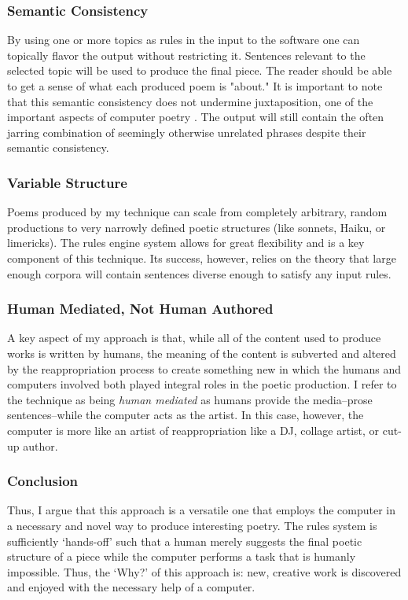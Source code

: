 \documentclass[10pt]{article}
\begin{document}
\subsubsection{Semantic Consistency}
By using one or more topics as rules in the input to the software one can
topically flavor the output without restricting it. Sentences relevant to the
selected topic will be used to produce the final piece. The reader should be
able to get a sense of what each produced poem is "about." It is important to
note that this semantic consistency does not undermine juxtaposition, one of
the important aspects of computer poetry \cite{Hart96}. The output will still
contain the often jarring combination of seemingly otherwise unrelated phrases
despite their semantic consistency.

\subsubsection{Variable Structure}
Poems produced by my technique can scale from completely arbitrary, random
productions to very narrowly defined poetic structures (like sonnets, Haiku, or
limericks). The rules engine system allows for great flexibility and is a key
component of this technique. Its success, however, relies on the theory that
large enough corpora will contain sentences diverse enough to satisfy any input
rules.

\subsubsection{Human Mediated, Not Human Authored}
A key aspect of my approach is that, while all of the content used to produce
works is written by humans, the meaning of the content is subverted and altered
by the reappropriation process to create something new in which the humans and
computers involved both played integral roles in the poetic production. I refer
to the technique as being \emph{human mediated} as humans provide the
media--prose sentences--while the computer acts as the artist. In this case,
however, the computer is more like an artist of reappropriation like a DJ,
collage artist, or cut-up author.

\subsubsection{Conclusion}
Thus, I argue that this approach is a versatile one that employs the computer in a
necessary and novel way to produce interesting poetry. The rules system is
sufficiently `hands-off' such that a human merely suggests the final poetic
structure of a piece while the computer performs a task that is humanly
impossible. Thus, the `Why?' of this approach is: new, creative work is
discovered and enjoyed with the necessary help of a computer.
\end{document}
